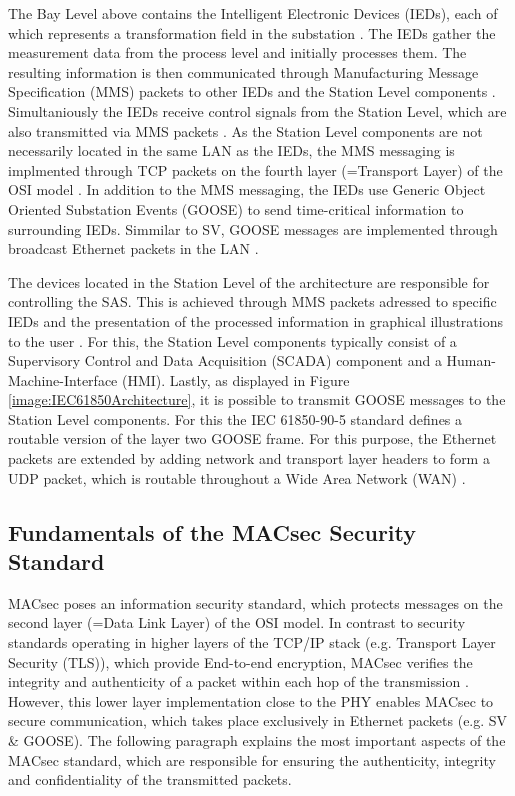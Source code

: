 \documentclass[conference]{IEEEtran}
\begin{document}
\smallskip
The Bay Level above contains the Intelligent Electronic Devices (IEDs), each of which represents a transformation field in the substation 
\cite[p. 39]{IEC61850-7-1:2011}. The IEDs gather the measurement data from the process level and initially processes them. The resulting information 
is then communicated through Manufacturing Message Specification (MMS) packets to other IEDs and the Station Level components \cite[p. 44]{IEC61850-8-1:2011}. 
Simultaniously the IEDs receive control signals from the Station Level, which are also transmitted via MMS packets \cite{trafficGen_IEC61850:2011}. 
As the Station Level components are not necessarily located in the same LAN as the IEDs, the MMS messaging is implmented through TCP packets on the 
fourth layer (=Transport Layer) of the OSI model \cite[p. 45]{IEC61850-8-1:2011}. In addition to the MMS messaging, the IEDs use Generic Object Oriented 
Substation Events (GOOSE) to send time-critical information to surrounding IEDs. Simmilar to SV, GOOSE messages are implemented through broadcast 
Ethernet packets in the LAN \cite{GOOSE_confidentiality_integrity:2020}.

\smallskip
The devices located in the Station Level of the architecture are responsible for controlling the SAS. This is achieved through MMS packets adressed 
to specific IEDs and the presentation of the processed information in graphical illustrations to the user \cite{SGRWin_IEC61850Architecture:2021}. 
For this, the Station Level components typically consist of a Supervisory Control and Data Acquisition (SCADA) component and a Human-Machine-Interface 
(HMI). Lastly, as displayed in Figure \ref{image:IEC61850Architecture}, it is possible to transmit GOOSE messages to the Station Level components. For 
this the IEC 61850-90-5 standard \cite{IEC61850-90-5:2012} defines a routable version of the layer two GOOSE frame. For this purpose, the Ethernet 
packets are extended by adding network and transport layer headers to form a UDP packet, which is routable throughout a Wide Area Network (WAN) 
\cite{routable_GOOSE_SV:2020}.

\subsection{Fundamentals of the MACsec Security Standard}
\noindent MACsec poses an information security standard, which protects messages on the second layer (=Data Link Layer) of the OSI model. In contrast 
to security standards operating in higher layers of the TCP/IP stack (e.g. Transport Layer Security (TLS)), which provide End-to-end encryption, MACsec 
verifies the integrity and authenticity of a packet within each hop of the transmission \cite{Cybersecurity_Substation:2016}. However, this lower layer 
implementation close to the PHY enables MACsec to secure communication, which takes place exclusively in Ethernet packets (e.g. SV \& GOOSE). The following 
paragraph explains the most important aspects of the MACsec standard, which are responsible for ensuring the authenticity, integrity and confidentiality of 
the transmitted packets.
\end{document}
